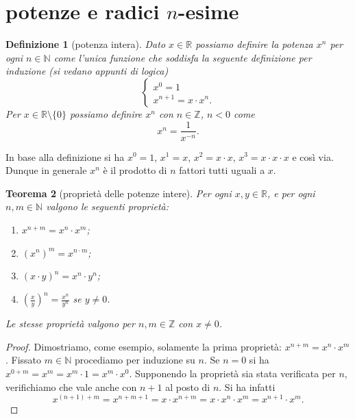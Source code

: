 \documentclass[italian,a4paper,oneside,headinclude]{scrbook}
\newcommand{\NN}{\mathbb N}
\newcommand{\RR}{\mathbb R}
\newcommand{\ZZ}{\mathbb Z}
\newcommand{\enclose}[1]{{\left( #1 \right)}}
\newtheorem{theorem}{Teorema}
\newtheorem{definition}[theorem]{Definizione}
\begin{document}
%
%
\section{potenze e radici $n$-esime}

\begin{definition}[potenza intera]
Dato $x \in \RR$ possiamo definire la potenza $x^n$ per ogni
$n\in \NN$ come l'unica funzione che soddisfa
la seguente definizione per induzione (si vedano appunti di logica)
\[
\begin{cases}
  x^0 = 1\\
  x^{n+1} = x\cdot x^n.
\end{cases}
\]
Per $x\in \RR\setminus\{0\}$ possiamo definire $x^n$ con $n\in \ZZ$, $n<0$
come
\[
x^n = \frac{1}{x^{-n}}.
\]
\end{definition}

In base alla definizione si ha $x^0 = 1$, $x^1=x$, $x^2=x\cdot x$,
$x^3=x\cdot x \cdot x$ e così via. Dunque in generale
$x^n$ è il prodotto di $n$ fattori tutti uguali a $x$.

\begin{theorem}[proprietà delle potenze intere]
Per ogni $x,y\in \RR$, e per ogni $n,m \in \NN$
valgono le seguenti proprietà:
\begin{enumerate}
  \item  $x^{n+m} = x^n \cdot x^m$;
  \item $(x^n)^m = x^{n\cdot m}$;
  \item $(x\cdot y)^n = x^n \cdot y^n$;
  \item $\displaystyle \enclose{\frac{x}{y}}^n = \frac{x^n}{y^n}$ se $y\neq 0$.
\end{enumerate}
Le stesse proprietà valgono per $n,m \in\ZZ$ con $x\neq 0$.
\end{theorem}
%
\begin{proof}
Dimostriamo, come esempio, solamente la prima proprietà: $x^{n+m} = x^n \cdot x^m$.
Fissato $m\in \NN$ procediamo per induzione su $n$.
Se $n=0$ si ha $x^{0+m} = x^m = x^m \cdot 1 = x^m \cdot x^0$.
Supponendo la proprietà sia stata verificata per $n$, verifichiamo
che vale anche con $n+1$ al posto di $n$. Si ha infatti
\[
 x^{(n+1)+m} = x^{n+m+1} = x \cdot x^{n+m} = x \cdot x^n \cdot x^m
  = x^{n+1} \cdot x^m.
\]
\end{proof}
\end{document}
